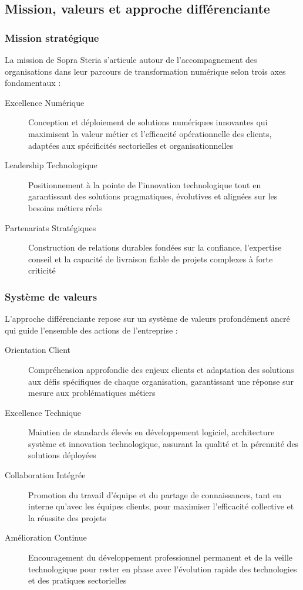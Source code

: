 \subsection{Mission, valeurs et approche différenciante}

\subsubsection{Mission stratégique}

La mission de Sopra Steria s'articule autour de l'accompagnement des organisations dans leur parcours de transformation numérique selon trois axes fondamentaux :

\begin{description}
    \item[Excellence Numérique] Conception et déploiement de solutions numériques innovantes qui maximisent la valeur métier et l'efficacité opérationnelle des clients, adaptées aux spécificités sectorielles et organisationnelles
    \item[Leadership Technologique] Positionnement à la pointe de l'innovation technologique tout en garantissant des solutions pragmatiques, évolutives et alignées sur les besoins métiers réels
    \item[Partenariats Stratégiques] Construction de relations durables fondées sur la confiance, l'expertise conseil et la capacité de livraison fiable de projets complexes à forte criticité
\end{description}

\subsubsection{Système de valeurs}

L'approche différenciante repose sur un système de valeurs profondément ancré qui guide l'ensemble des actions de l'entreprise :

\begin{description}
    \item[Orientation Client] Compréhension approfondie des enjeux clients et adaptation des solutions aux défis spécifiques de chaque organisation, garantissant une réponse sur mesure aux problématiques métiers
    \item[Excellence Technique] Maintien de standards élevés en développement logiciel, architecture système et innovation technologique, assurant la qualité et la pérennité des solutions déployées
    \item[Collaboration Intégrée] Promotion du travail d'équipe et du partage de connaissances, tant en interne qu'avec les équipes clients, pour maximiser l'efficacité collective et la réussite des projets
    \item[Amélioration Continue] Encouragement du développement professionnel permanent et de la veille technologique pour rester en phase avec l'évolution rapide des technologies et des pratiques sectorielles
\end{description}

